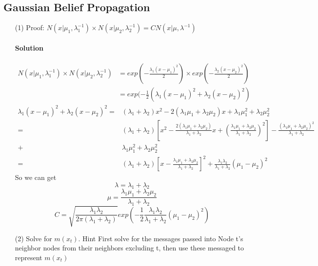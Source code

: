 \documentclass[twoside]{article}
\begin{document}
\subsection{Gaussian Belief Propagation}
\begin{itemize}
\item[(1)] Proof: $N(x|\mu_1,\lambda^{-1}_1) \times N(x|\mu_2, \lambda_2^{-1}) = CN(x|\mu, \lambda^{-1}) $
\paragraph{Solution}
\begin{align*}
N(x|\mu_1,\lambda^{-1}_1) \times N(x|\mu_2, \lambda_2^{-1}) &= exp(-\frac{\lambda_1 (x-\mu_1)^2}{2}) \times exp(-\frac{\lambda_2 (x-\mu_2)^2}{2})\\
&=exp(-\frac{1}{2}(\lambda_1 (x-\mu_1)^2 + \lambda_2 (x-\mu_2)^2)
\end{align*}
\begin{align*}
\lambda_1 (x-\mu_1)^2 + \lambda_2 (x-\mu_2)^2 =&(\lambda_1+\lambda_2)x^2 -2(\lambda_1\mu_1+\lambda_2\mu_2)x+\lambda_1\mu_1^2+\lambda_2\mu_2^2\\
=&(\lambda_1+\lambda_2)[x^2-\frac{2(\lambda_1\mu_1+\lambda_2\mu_2)}{\lambda_1+\lambda_2}x +(\frac{\lambda_1\mu_1+\lambda_2\mu_2}{\lambda_1+\lambda_2})^2]-\frac{(\lambda_1\mu_1+\lambda_2\mu_2)^2}{\lambda_1+\lambda_2}\\
+& \lambda_1\mu_1^2+\lambda_2\mu_2^2\\
=&(\lambda_1+\lambda_2)[x-\frac{\lambda_1\mu_1+\lambda_2\mu_2}{\lambda_1+\lambda_2}]^2+\frac{\lambda_1\lambda_2}{\lambda_1+\lambda_2}(\mu_1-\mu_2)^2
\end{align*}
So we can get
$$\lambda=\lambda_1+\lambda_2$$
$$\mu=\frac{\lambda_1\mu_1+\lambda_2\mu_2}{\lambda_1+\lambda_2}$$
$$C=\sqrt{\frac{\lambda_1\lambda_2}{2\pi(\lambda_1+\lambda_2)}}exp(-\frac{1}{2}\frac{\lambda_1\lambda_2}{\lambda_1+\lambda_2}(\mu_1-\mu_2)^2)$$

\item[(2)] Solve for $m(x_t)$. Hint First solve for the messages passed into Node t's neighbor nodes from their neighbors excluding t, then use these messaged to represent $m(x_t)$

\end{itemize}
\end{document}
